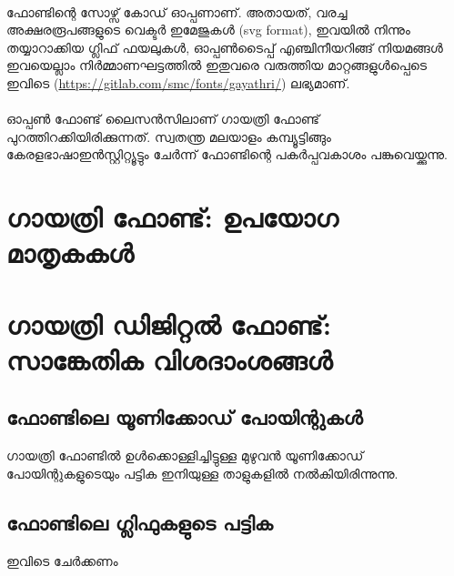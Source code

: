 \documentclass[12pt]{article}
\begin{document}
	\paragraph{}
	ഫോണ്ടിന്റെ സോഴ്സ് കോഡ് ഓപ്പണാണ്. അതായത്, വരച്ച അക്ഷരരൂപങ്ങളുടെ വെക്ടര്‍ ഇമേജുകള്‍ (svg format), ഇവയില്‍ നിന്നും തയ്യാറാക്കിയ ഗ്ലിഫ് ഫയലുകള്‍, ഓപ്പണ്‍ടൈപ്പ് എഞ്ചിനീയറിങ്ങ് നിയമങ്ങള്‍ ഇവയെല്ലാം നിര്‍മ്മാണഘട്ടത്തില്‍ ഇതുവരെ വരുത്തിയ മാറ്റങ്ങളുള്‍പ്പെടെ ഇവിടെ (\url{https://gitlab.com/smc/fonts/gayathri/}) ലഭ്യമാണ്.
	
	\paragraph{}
		ഓപ്പണ്‍ ഫോണ്ട് ലൈസന്‍സിലാണ് ഗായത്രി ഫോണ്ട് പുറത്തിറക്കിയിരിക്കുന്നത്. സ്വതന്ത്ര മലയാളം കമ്പ്യൂട്ടിങ്ങും കേരളഭാഷാഇന്‍സ്റ്റിറ്റ്യൂട്ടും ചേര്‍ന്ന് ഫോണ്ടിന്റെ പകര്‍പ്പവകാശം പങ്കുവെയ്ക്കുന്നു.
	
	
	\section{ഗായത്രി ഫോണ്ട്: ഉപയോഗ മാതൃകകള്‍‍}
	

	
	
	
	\section{ഗായത്രി ഡിജിറ്റല്‍ ഫോണ്ട്: സാങ്കേതിക വിശദാംശങ്ങള്‍}
	
	\subsection{ഫോണ്ടിലെ യൂണിക്കോഡ് പോയിന്റുകള്‍}
	ഗായത്രി ഫോണ്ടില്‍ ഉള്‍ക്കൊള്ളിച്ചിട്ടുള്ള മുഴുവന്‍ യൂണിക്കോഡ് പോയിന്റുകളുടെയും പട്ടിക ഇനിയുള്ള താളുകളില്‍ നല്‍കിയിരിന്നുന്നു.
	


	\subsection{ഫോണ്ടിലെ ഗ്ലിഫുകളുടെ പട്ടിക}
		ഇവിടെ ചേര്‍ക്കണം
	

	
\end{document}
